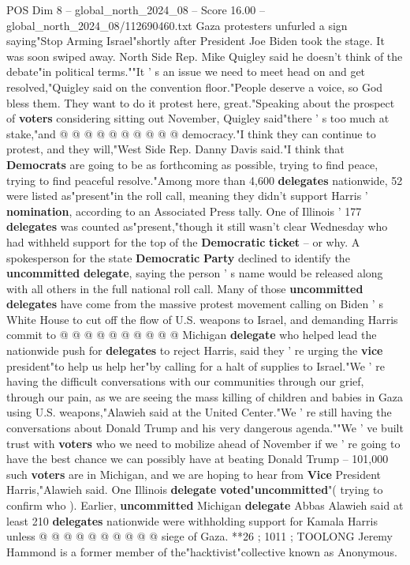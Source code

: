 \begin{textsample}{POS Dim 8 – global\_north\_2024\_08 – Score 16.00 – global\_north\_2024\_08/112690460.txt}
Gaza protesters unfurled a sign saying"Stop Arming Israel"shortly after President Joe Biden took the stage.
It was soon swiped away.
North Side Rep.
Mike Quigley said he doesn't think of the debate"in political terms.""It ' s an issue we need to meet head on and get resolved,"Quigley said on the convention floor."People deserve a voice, so God bless them.
They want to do it protest here, great."Speaking about the prospect of \textbf{voters} considering sitting out November, Quigley said"there ' s too much at stake,"and @ @ @ @ @ @ @ @ @ @ democracy."I think they can continue to protest, and they will,"West Side Rep.
Danny Davis said."I think that \textbf{Democrats} are going to be as forthcoming as possible, trying to find peace, trying to find peaceful resolve."Among more than 4,600 \textbf{delegates} nationwide, 52 were listed as"present"in the roll call, meaning they didn't support Harris ' \textbf{nomination}, according to an Associated Press tally.
One of Illinois ' 177 \textbf{delegates} was counted as"present,"though it still wasn't clear Wednesday who had withheld support for the top of the \textbf{Democratic} \textbf{ticket} -- or why.
A spokesperson for the state \textbf{Democratic} \textbf{Party} declined to identify the \textbf{uncommitted} \textbf{delegate}, saying the person ' s name would be released along with all others in the full national roll call.
Many of those \textbf{uncommitted} \textbf{delegates} have come from the massive protest movement calling on Biden ' s White House to cut off the flow of U.S. weapons to Israel, and demanding Harris commit to @ @ @ @ @ @ @ @ @ @ Michigan \textbf{delegate} who helped lead the nationwide push for \textbf{delegates} to reject Harris, said they ' re urging the \textbf{vice} president"to help us help her"by calling for a halt of supplies to Israel."We ' re having the difficult conversations with our communities through our grief, through our pain, as we are seeing the mass killing of children and babies in Gaza using U.S. weapons,"Alawieh said at the United Center."We ' re still having the conversations about Donald Trump and his very dangerous agenda.""We ' ve built trust with \textbf{voters} who we need to mobilize ahead of November if we ' re going to have the best chance we can possibly have at beating Donald Trump -- 101,000 such \textbf{voters} are in Michigan, and we are hoping to hear from \textbf{Vice} President Harris,"Alawieh said.
One Illinois \textbf{delegate} \textbf{voted}"\textbf{uncommitted}"( trying to confirm who ).
Earlier, \textbf{uncommitted} Michigan \textbf{delegate} Abbas Alawieh said at least 210 \textbf{delegates} nationwide were withholding support for Kamala Harris unless @ @ @ @ @ @ @ @ @ @ siege of Gaza. **26 ; 1011 ; TOOLONG Jeremy Hammond is a former member of the"hacktivist"collective known as Anonymous.

\end{textsample}
